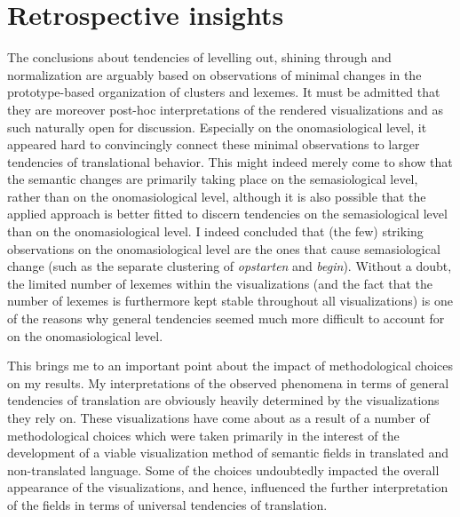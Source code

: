 \section{Retrospective insights}
\label{sec:6.2}  
The conclusions about tendencies of levelling out, shining through and normalization are arguably based on observations of minimal changes in the prototype-based organization of clusters and lexemes. It must be admitted that they are moreover post-hoc interpretations of the rendered visualizations and as such naturally open for discussion. Especially on the onomasiological level, it appeared hard to convincingly connect these minimal observations to larger tendencies of translational behavior. This might indeed merely come to show that the semantic changes are primarily taking place on the semasiological level, rather than on the onomasiological level, although it is also possible that the applied approach is better fitted to discern tendencies on the semasiological level than on the onomasiological level. I indeed concluded that (the few) striking observations on the onomasiological level are the ones that cause semasiological change (such as the separate clustering of \textit{opstarten} and \textit{begin}). Without a doubt, the limited number of lexemes within the visualizations (and the fact that the number of lexemes is furthermore kept stable throughout all visualizations) is one of the reasons why general tendencies seemed much more difficult to account for on the onomasiological level.

This brings me to an important point about the impact of methodological choices on my results. My interpretations of the observed phenomena in terms of general tendencies of translation are obviously heavily determined by the visualizations they rely on. These visualizations have come about as a result of a number of methodological choices which were taken primarily in the interest of the development of a viable visualization method of semantic fields in translated and non-translated language. Some of the choices undoubtedly impacted the overall appearance of the visualizations, and hence, influenced the further interpretation of the fields in terms of universal tendencies of translation.

